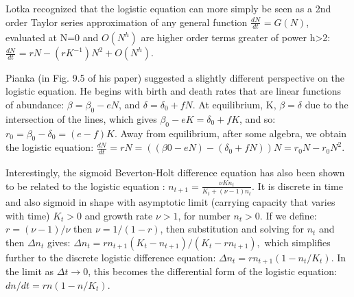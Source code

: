 \documentclass[
	letterpaper, %
	10pt, %
]{article}
\begin{document}
\begin{appendices}
Lotka \cite{Lotka_1925} recognized
that the logistic equation can more simply be seen as a 2nd order
Taylor series approximation of any general function 
${\frac{\mathit{dN}}{\mathit{dt}}_{}=G}{(N)}$, evaluated at N=0 and 
$O{(N^{h})}$ are higher order terms greater of power h\textgreater2: 
${\frac{\mathit{dN}}{\mathit{dt}}_{}=\mathit{rN}}-{({rK^{-1}})}{N^{2}+O}{(N^{h})}.$ 


Pianka \cite{Pianka_1970} (in Fig. 9.5 of his paper) suggested
a slightly different perspective on the logistic equation. He begins
with birth and death rates that are linear functions of abundance:
${\beta=\beta}_{0}-\mathit{eN}$, and 
$\delta={\delta_{0}+\mathit{fN}}$. At equilibrium, K, 
$\beta=\delta$ due to the intersection of the lines, which gives
${\beta_{0}-\mathit{eK}}={\delta_{0}+\mathit{fK}}$, and so: ${r_{0}={\beta_{0}-\delta_{0}}={({e-f})}}K$. Away from equilibrium, after some algebra, we obtain the logistic
equation: $\frac{\mathit{dN}}{\mathit{dt}}_{}=\mathit{rN}={{({{({\beta{0-\mathit{eN}}})}-{({\delta_{0}+\mathit{fN}})}})}{N=r_{0}}{N-r_{0}}N^{2}.}$ 

Interestingly, the sigmoid Beverton-Holt difference equation has also
been shown to be related to the logistic equation \cite{Beverton_Holt_1957, Bohner_Chieochan_2013}: ${n_{t+1}=\frac{\nu Kn_{t}}{{K_{t}+{({\nu-1})}}n_{t}}}.$ 
It is discrete in time and also sigmoid in shape with asymptotic limit
(carrying capacity that varies with time) 
${K_{t}}>0$ and growth rate 
$\nu>1$, for number 
$n_{t}>0$. If we define: 
$r={{({\nu-1})}/\nu}$ then 
$\nu={1/{({1-r})}}$, then substitution and solving for 
$n_{t}$ and then 
${\Delta n}_{t}$ gives: 
${{\Delta n}_{t}=r}n_{t+1}{{({K_{t}-n_{t+1}})}/{({{K_{t}-r}n_{t+1}})}},$ which simplifies further to the discrete logistic difference equation:
${{\Delta n}_{t}=r}n_{t+1}{({1-{n_{t}/K_{t}}})}$. In the limit as 
$\Delta t\rightarrow0$, this becomes the differential form of the logistic equation: 
${{{\mathit{dn}/\mathit{dt}}=\mathit{rn}}{({1-{n/K_{t}}})}.}$ 



\end{appendices}
\end{document}

